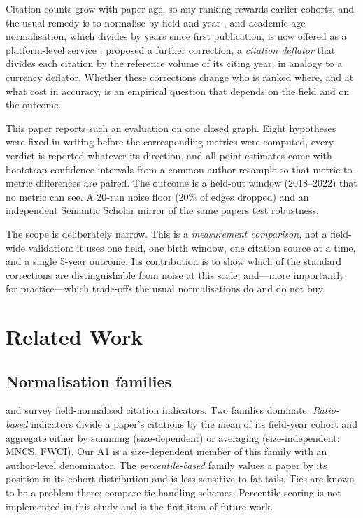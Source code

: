 \documentclass{article}
\begin{document}
Citation counts grow with paper age, so any ranking rewards earlier cohorts, and the usual remedy
is to normalise by field and year \citep{waltman2019chapter}, and academic-age normalisation, which
divides by years since first publication, is now offered as a platform-level service
\citep{gyorffy2026platform}. \citet{petersen2019inflation} proposed a further correction, a \emph{citation
deflator} that divides each citation by the reference volume of its citing year, in analogy to a
currency deflator. Whether these corrections change who is ranked
where, and at what cost in accuracy, is an empirical question that depends on the field and on
the outcome.

This paper reports such an evaluation on one closed graph. Eight hypotheses were fixed in writing
before the corresponding metrics were computed, every verdict is reported whatever its direction,
and all point estimates come with bootstrap confidence intervals from a common author resample so
that metric-to-metric differences are paired. The outcome is a held-out window (2018--2022) that
no metric can see. A 20-run noise floor (20\% of edges dropped) and an independent Semantic
Scholar mirror of the same papers test robustness.

The scope is deliberately narrow. This is a \emph{measurement comparison}, not a field-wide
validation: it uses one field, one birth window, one citation source at a time, and a single
5-year outcome. Its contribution is to show which of the standard corrections are distinguishable
from noise at this scale, and---more importantly for practice---which trade-offs the usual
normalisations do and do not buy.

\section{Related Work}

\subsection{Normalisation families}

\citet{waltman2016review} and \citet{waltman2019chapter} survey field-normalised citation indicators. Two
families dominate. \emph{Ratio-based} indicators divide a paper's citations by the mean of its
field-year cohort and aggregate either by summing (size-dependent) or averaging
(size-independent: MNCS, FWCI). Our A1 is a size-dependent member of this family with an
author-level denominator. The \emph{percentile-based} family
\citep{tijssen2002benchmark, vanleeuwen2003holy, leydesdorff2011turning, albarran2011skewness} values a paper by its position
in its cohort distribution and is less sensitive to fat tails. Ties are known to be a problem
there; \citet{waltman2013percentile} compare tie-handling schemes. Percentile scoring is not implemented in
this study and is the first item of future work.
\end{document}
